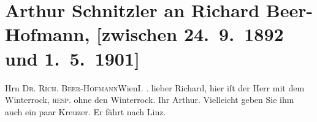 

         
         \renewcommand{\erwaehntePersonen}{Personen:  ?? [Mann ohne Winterrock], Richard Beer-Hofmann}
         \renewcommand{\erwaehnteOrte}{Orte: Linz, Wien, Wollzeile}
         \renewcommand{\erwaehnteWerke}{}
               \section[Arthur Schnitzler an Richard Beer-Hofmann, {[}zwischen 24. 9. 1892 und 1. 5. 1901{]}]{ Arthur Schnitzler an Richard Beer-Hofmann, {[}zwischen 24. 9. 1892 und
               1. 5. 1901{]}}\nopagebreak{}\rehead{ }\begin{ledgroupsized}[t]{13cm}\normalsize\beginnumbering \toendnotes[C]{\smallbreak\pagebreak[2]} 
\toendnotes[C]{\smallbreak}\pstart{}{\pb}Hrn \textsc{Dr. Rich.
                     Beer-Hofmann}\pend{}\pstart{}Wien\pend{}\pstart{}\textsc{I. \label{K_L00120-1v}\label{K_L00120-1h}.}\pend{}{\bigskip}\pstart
           \noindent{}{\pb}lieber Richard,  hier iſt der Herr mit dem Winterrock, \textsc{resp.}
               ohne den Winterrock.\pend
           \pstart Ihr \spacefill\mbox{Arthur.}\pend{}\pstart
           \noindent{}{\pb}Vielleicht geben Sie ihm auch ein paar Kreuzer. Er
                  fährt nach Linz.\pend
           
         
         \endnumbering{}\end{ledgroupsized}  \newcommand{\dateiname}{L00120}\newcommand{\titel}{Arthur Schnitzler an Richard Beer-Hofmann, [zwischen 24. 9. 1892 und 1. 5. 1901]}\newcommand{\editorInnen}{Martin Anton Müller und Gerd-Hermann Susen}
      